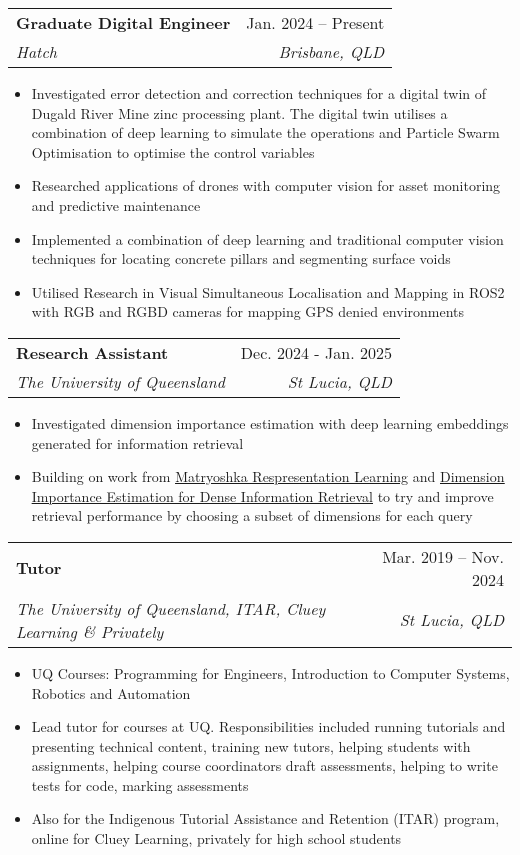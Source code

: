 \documentclass[letterpaper,11pt]{article}
\makeatletter
\newcommand{\resumeItem}[1]{
  \item\small{
    {#1 \vspace{-2pt}}
  }
}
\newcommand{\resumeSubheading}[4]{
  \vspace{-2pt}\item
  \begin{tabular*}{0.97\textwidth}[t]{l@{\extracolsep{\fill}}r}
    \textbf{#1} & #2 \\
    \textit{\small#3} & \textit{\small #4} \\
  \end{tabular*}\vspace{-7pt}
}
\newcommand{\resumeSubSubheading}[2]{
  \item
  \begin{tabular*}{0.97\textwidth}{l@{\extracolsep{\fill}}r}
    \textit{\small#1} & \textit{\small #2} \\
  \end{tabular*}\vspace{-7pt}
}
\newcommand{\resumeSubHeadingListEnd}{\end{itemize}}
\newcommand{\resumeItemListStart}{\begin{itemize}}
\newcommand{\resumeItemListEnd}{\end{itemize}\vspace{-5pt}}
\makeatother
\begin{document}
\resumeSubheading
{Graduate Digital Engineer}{Jan. 2024 -- Present}
{Hatch}{Brisbane, QLD}
\resumeItemListStart
\resumeItem{Investigated error detection and correction techniques for a digital twin of
  Dugald River Mine zinc processing plant. The digital twin utilises a
  combination of deep learning to simulate the operations and Particle Swarm
  Optimisation to optimise the control variables}
\resumeItem{Researched applications of drones with computer vision for asset monitoring and
  predictive maintenance}
\resumeItem{Implemented a combination of deep learning and traditional computer vision
  techniques for locating concrete pillars and segmenting surface voids}
\resumeItem{Utilised Research in Visual Simultaneous Localisation and Mapping in ROS2 with
  RGB and RGBD cameras for mapping GPS denied environments}
\resumeItemListEnd

\resumeSubheading
{Research Assistant}{Dec. 2024 - Jan. 2025}
{The University of Queensland}{St Lucia, QLD}
\resumeItemListStart
\resumeItem{Investigated dimension importance estimation with deep learning embeddings
  generated for information retrieval}
\resumeItem{\sloppy Building on work from \href{https://doi.org/10.48550/arXiv.2205.13147}{\ul{Matryoshka Respresentation Learning}} and \href{https://doi.org/10.1145/3626772.3657691}{\ul{Dimension Importance Estimation for Dense Information Retrieval}}
  to try and improve retrieval performance by choosing a subset of dimensions for
  each query}
\resumeItemListEnd

\resumeSubheading
{Tutor}{Mar. 2019 -- Nov. 2024}
{The University of Queensland, ITAR, Cluey Learning \& Privately}{St Lucia, QLD}
\resumeItemListStart
\resumeItem{UQ Courses: Programming for Engineers, Introduction to Computer Systems, Robotics and Automation}
\resumeItem{Lead tutor for courses at UQ. Responsibilities included running tutorials and
  presenting technical content, training new tutors, helping students with assignments,
  helping course coordinators draft assessments, helping to write tests for code, marking assessments}
\resumeItem{Also for the Indigenous Tutorial Assistance and Retention (ITAR)
  program, online for Cluey Learning, privately for high school students}
\resumeItemListEnd
\end{document}
